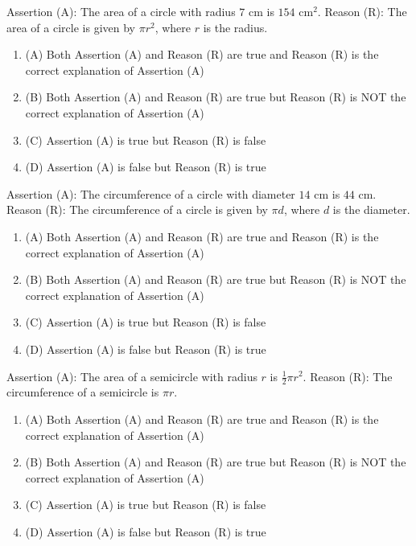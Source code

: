 \documentclass[12pt,a4paper]{exam}
\begin{document}
\begin{questions}
\question[1] Assertion (A): The area of a circle with radius $7$ cm is $154$ cm$^2$. Reason (R): The area of a circle is given by $\pi r^2$, where $r$ is the radius.
\begin{enumerate}[label=(\Alph*)]
  \item (A) Both Assertion (A) and Reason (R) are true and Reason (R) is the correct explanation of Assertion (A)
  \item (B) Both Assertion (A) and Reason (R) are true but Reason (R) is NOT the correct explanation of Assertion (A)
  \item (C) Assertion (A) is true but Reason (R) is false
  \item (D) Assertion (A) is false but Reason (R) is true
\end{enumerate}
\vspace{0.15cm}

\question[1] Assertion (A): The circumference of a circle with diameter $14$ cm is $44$ cm. Reason (R): The circumference of a circle is given by $\pi d$, where $d$ is the diameter.
\begin{enumerate}[label=(\Alph*)]
  \item (A) Both Assertion (A) and Reason (R) are true and Reason (R) is the correct explanation of Assertion (A)
  \item (B) Both Assertion (A) and Reason (R) are true but Reason (R) is NOT the correct explanation of Assertion (A)
  \item (C) Assertion (A) is true but Reason (R) is false
  \item (D) Assertion (A) is false but Reason (R) is true
\end{enumerate}
\vspace{0.15cm}

\question[1] Assertion (A): The area of a semicircle with radius $r$ is $\frac{1}{2} \pi r^2$. Reason (R): The circumference of a semicircle is $\pi r$.
\begin{enumerate}[label=(\Alph*)]
  \item (A) Both Assertion (A) and Reason (R) are true and Reason (R) is the correct explanation of Assertion (A)
  \item (B) Both Assertion (A) and Reason (R) are true but Reason (R) is NOT the correct explanation of Assertion (A)
  \item (C) Assertion (A) is true but Reason (R) is false
  \item (D) Assertion (A) is false but Reason (R) is true
\end{enumerate}
\vspace{0.15cm}


\end{questions}
\end{document}
